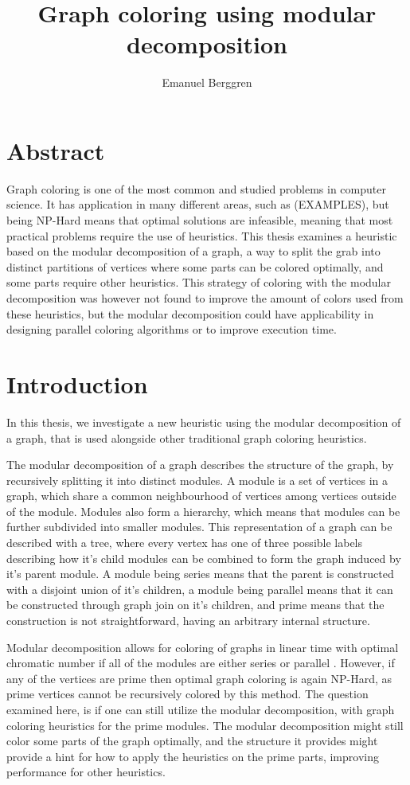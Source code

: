 \documentclass{amsart}
\author{Emanuel Berggren}
\title{Graph coloring using modular decomposition}
\begin{document}
\maketitle

\section{Abstract}

Graph coloring is one of the most common and studied problems in computer
science. It has application in many different areas, such as (EXAMPLES), but
being NP-Hard means that optimal solutions are infeasible, meaning that most
practical problems require the use of heuristics. This thesis examines a
heuristic based on the modular decomposition of a graph, a way to split the grab
into distinct partitions of vertices where some parts can be colored optimally,
and some parts require other heuristics. This strategy of coloring with the
modular decomposition was however not found to improve the amount of colors used
from these heuristics, but the modular decomposition could have applicability in
designing parallel coloring algorithms or to improve execution time.

\section{Introduction}

In this thesis, we investigate a new heuristic using the modular decomposition of
a graph, that is used alongside other traditional graph coloring heuristics.

The modular decomposition of a graph describes the structure of the graph, by
recursively splitting it into distinct modules. A module is a set of vertices in
a graph, which share a common neighbourhood of vertices among vertices outside
of the module. Modules also form a hierarchy, which means that modules can be
further subdivided into smaller modules. This representation of a graph can be
described with a tree, where every vertex has one of three possible labels
describing how it's child modules can be combined to form the graph induced by
it's parent module. A module being series means that the parent is constructed
with a disjoint union of it's children, a module being parallel means that it
can be constructed through graph join on it's children, and prime means that the
construction is not straightforward, having an arbitrary internal structure.

Modular decomposition allows for coloring of graphs in linear time with optimal
chromatic number if all of the modules are either  series or
parallel \cite{HCL}. However, if any of the vertices are prime then optimal graph coloring 
is again NP-Hard\cite{NPHard}, as prime vertices cannot be recursively colored by this
method. The question examined here, is if one can still utilize the
modular decomposition, with graph coloring heuristics for the prime modules.
The modular decomposition might still color some parts of the graph optimally,
and the structure it provides might provide a hint for how to apply the
heuristics on the prime parts, improving performance for other heuristics.
\end{document}

